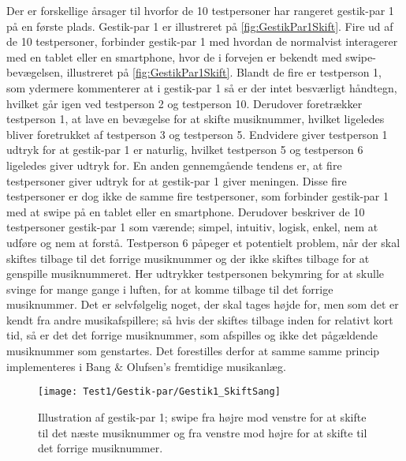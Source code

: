 Der er forskellige årsager til hvorfor de 10 testpersoner har rangeret gestik-par 1 på en første plads. Gestik-par 1 er illustreret på \autoref{fig:GestikPar1Skift}. Fire ud af de 10 testpersoner, forbinder gestik-par 1 med hvordan de normalvist interagerer med en tablet eller en smartphone, hvor de i forvejen er bekendt med swipe-bevægelsen, illustreret på \autoref{fig:GestikPar1Skift}. Blandt de fire er testperson 1, som ydermere kommenterer at i gestik-par 1 så er der intet besværligt håndtegn, hvilket går igen ved testperson 2 og testperson 10. Derudover foretrækker testperson 1, at lave en bevægelse for at skifte musiknummer, hvilket ligeledes bliver foretrukket af testperson 3 og testperson 5. Endvidere giver testperson 1 udtryk for at gestik-par 1 er naturlig, hvilket testperson 5 og testperson 6 ligeledes giver udtryk for. En anden gennemgående tendens er, at fire testpersoner giver udtryk for at gestik-par 1 giver meningen. Disse fire testpersoner er dog ikke de samme fire testpersoner, som forbinder gestik-par 1 med at swipe på en tablet eller en smartphone. Derudover beskriver de 10 testpersoner gestik-par 1 som værende; simpel, intuitiv, logisk, enkel, nem at udføre og nem at forstå. Testperson 6 påpeger et potentielt problem, når der skal skiftes tilbage til det forrige musiknummer og der ikke skiftes tilbage for at genspille musiknummeret. Her udtrykker testpersonen bekymring for at skulle svinge for mange gange i luften, for at komme tilbage til det forrige musiknummer. Det er selvfølgelig noget, der skal tages højde for, men som det er kendt fra andre musikafspillere; så hvis der skiftes tilbage inden for relativt kort tid, så er det det forrige musiknummer, som afspilles og ikke det pågældende musiknummer som genstartes. Det forestilles derfor at samme samme princip implementeres i Bang $\&$ Olufsen's fremtidige musikanlæg. 
%
\begin{figure}[H]
	\centering
	\texttt{[image: Test1/Gestik-par/Gestik1\_SkiftSang]}
	\caption{Illustration af gestik-par 1; swipe fra højre mod venstre for at skifte til det næste musiknummer og fra venstre mod højre for at skifte til det forrige musiknummer.}
	\label{fig:GestikPar1Skift}
\end{figure}
\noindent
% 
